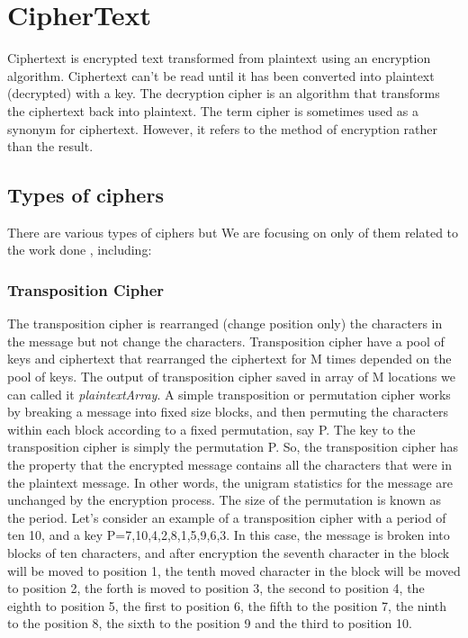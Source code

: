 \section{CipherText}
Ciphertext is encrypted text transformed from plaintext using an encryption algorithm. Ciphertext can't be read until it has been converted into  plaintext (decrypted) with a key. The decryption cipher is an algorithm that transforms the ciphertext back into plaintext.
The term cipher is sometimes used as a synonym for ciphertext. However, it refers to the method of encryption rather than the result.

\subsection{Types of ciphers}
There are various types of ciphers but We are focusing on only of them related to the work done , including:

\subsubsection{Transposition Cipher}
The transposition cipher is rearranged (change position only) the characters in the message but not change the characters. Transposition cipher have a pool of keys and ciphertext that rearranged the ciphertext for M times depended on the pool of keys. The output of transposition cipher saved in array of M locations we can called it \textit{plaintextArray}.
A simple transposition or permutation cipher works by breaking a message into fixed size blocks, and then permuting the characters within each block according to a fixed permutation, say P. The key to the transposition cipher is simply the permutation P. So, the transposition cipher has the property that the encrypted message contains all the characters that were in the plaintext message. In other words, the unigram statistics for the message are unchanged by the encryption process. The size of the permutation is known as the period. Let's consider an example of a transposition cipher with a period of ten 10, and a key P={7,10,4,2,8,1,5,9,6,3}. In this case, the message is broken into blocks of ten characters, and after encryption the seventh character in the block will be moved to position 1, the tenth moved character in the block will be moved to position 2, the forth is moved to position 3, the second to position 4, the eighth to position 5, the first to position 6, the fifth to the position 7, the ninth to the position 8, the sixth to the position 9 and the third to position 10.


